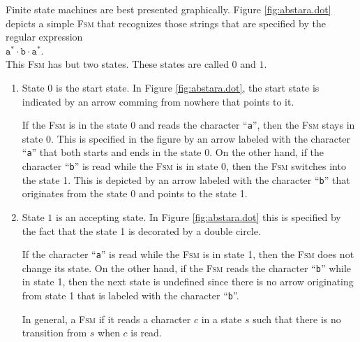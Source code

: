 \noindent
Finite state machines are best presented graphically.  Figure \ref{fig:abstara.dot} depicts a simple
\textsc{Fsm} that recognizes those strings that are specified by the regular expression
\\[0.2cm]
\hspace*{1.3cm}
$\texttt{a}^*\cdot\texttt{b}\cdot\texttt{a}^*$.
\\[0.2cm]
This \textsc{Fsm} has but two states.  These states are called $0$ and $1$.
\begin{enumerate}
\item State $0$  is the start state.  In Figure \ref{fig:abstara.dot}, the start state is indicated by an arrow
      comming from nowhere that points to it.  
  
      If the \textsc{Fsm} is in the state 0 and reads the character ``\texttt{a}'', then the
      \textsc{Fsm} stays in state 0.  This is specified in the figure by an arrow labeled with the
      character ``\texttt{a}'' that both starts and ends in the state 0.  On the other hand, if the
      character ``\texttt{b}'' is read while the \textsc{Fsm} is in state 0, then the \textsc{Fsm}
      switches into the state 1.  This is depicted by an arrow labeled with the character
      ``\texttt{b}'' that originates from the state 0 and points to the state 1.
\item State  $1$ is an accepting state. In Figure \ref{fig:abstara.dot} this is specified by the
      fact that the state 1 is decorated by a double circle.

      If the character ``\texttt{a}'' is read while the \textsc{Fsm} is in state 1, then the
      \textsc{Fsm} does not change its state.  On the other hand, if the \textsc{Fsm} reads the
      character ``\texttt{b}'' while in state 1, then the next state is undefined since there is no
      arrow originating from state 1 that is labeled with the character ``\texttt{b}''.

      In general, a \textsc{Fsm}  
      if it reads a character $c$ in a state $s$ such that there is no transition from $s$ when $c$ is read.
\end{enumerate}

